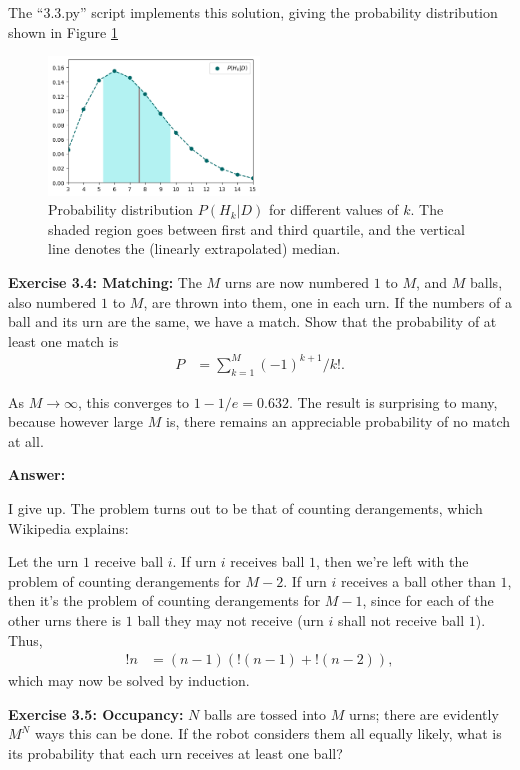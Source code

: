 \documentclass{article}
\begin{document}
The ``3.3.py'' script implements this solution, giving the probability distribution shown in Figure \ref{fig:3.3}
\begin{figure}[h]
	\center
	\includegraphics[width=0.5\textwidth]{Numerical/3.3.png}
	\caption{Probability distribution $P(H_k|D)$ for different values of $k$. The shaded region goes between first and third quartile, and the vertical line denotes the (linearly extrapolated) median.}
	\label{fig:3.3}
\end{figure}

\textbf{Exercise 3.4: Matching: }The $M$ urns are now numbered $1$ to $M$, and $M$ balls, also numbered $1$ to $M$, are thrown into them, one in each urn. If the numbers of a ball and its urn are the same, we have a match. Show that the probability of at least one match is
\begin{align*}
	P&=\sum_{k=1}^M(-1)^{k+1}/k!.
\end{align*}

As $M\rightarrow\infty$, this converges to $1-1/e=0.632$. The result is surprising to many, because however large $M$ is, there remains an appreciable probability of no match at all.

\textbf{Answer:}

I give up. The problem turns out to be that of counting derangements, which Wikipedia explains:

Let the urn $1$ receive ball $i$. If urn $i$ receives ball $1$, then we're left with the problem of counting derangements for $M-2$.
If urn $i$ receives a ball other than $1$, then it's the problem of counting derangements for $M-1$, since for each of the other urns there is $1$ ball they may not receive (urn $i$ shall not receive ball $1$). Thus,
\begin{align}
	!n&=(n-1)(!(n-1)+!(n-2)),
\end{align}
which may now be solved by induction.

\textbf{Exercise 3.5: Occupancy: }$N$ balls are tossed into $M$ urns; there are evidently $M^N$ ways this can be done. If the robot considers them all equally likely, what is its probability that each urn receives at least one ball?
\end{document}
